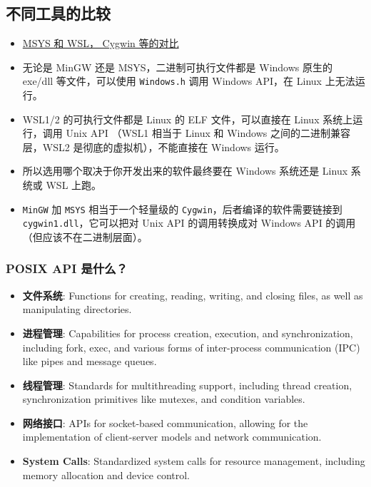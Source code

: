 
\subsection{不同工具的比较}
\begin{itemize}
\item \href{https://www.msys2.org/docs/what-is-msys2/}{MSYS 和 WSL， Cygwin 等的对比}
\item 无论是 MinGW 还是 MSYS，二进制可执行文件都是 Windows 原生的 exe/dll 等文件，可以使用 \verb`Windows.h` 调用 Windows API，在 Linux 上无法运行。
\item WSL1/2 的可执行文件都是 Linux 的 ELF 文件，可以直接在 Linux 系统上运行，调用 Unix API （WSL1 相当于 Linux 和 Windows 之间的二进制兼容层，WSL2 是彻底的虚拟机），不能直接在 Windows 运行。
\item 所以选用哪个取决于你开发出来的软件最终要在 Windows 系统还是 Linux 系统或 WSL 上跑。
\item \verb`MinGW` 加 \verb`MSYS` 相当于一个轻量级的 \verb`Cygwin`，后者编译的软件需要链接到 \verb`cygwin1.dll`，它可以把对 Unix API 的调用转换成对 Windows API 的调用（但应该不在二进制层面）。
\end{itemize}

\subsubsection{POSIX API 是什么？}
\begin{itemize}
\item \textbf{文件系统}: Functions for creating, reading, writing, and closing files, as well as manipulating directories.
\item \textbf{进程管理}: Capabilities for process creation, execution, and synchronization, including fork, exec, and various forms of inter-process communication (IPC) like pipes and message queues.
\item \textbf{线程管理}: Standards for multithreading support, including thread creation, synchronization primitives like mutexes, and condition variables.
\item \textbf{网络接口}: APIs for socket-based communication, allowing for the implementation of client-server models and network communication.
\item \textbf{System Calls}: Standardized system calls for resource management, including memory allocation and device control.
\end{itemize}

